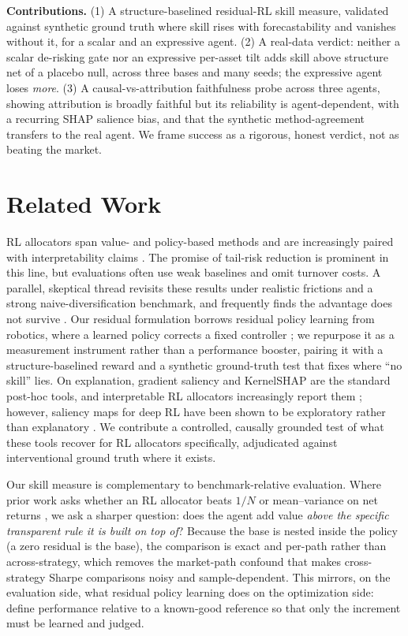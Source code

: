 \documentclass[sigconf,anonymous,review]{acmart}
\begin{document}
\noindent\textbf{Contributions.}
(1) A structure-baselined residual-RL skill measure, validated against synthetic
ground truth where skill rises with forecastability and vanishes without it, for a
scalar and an expressive agent.
(2) A real-data verdict: neither a scalar de-risking gate nor an expressive
per-asset tilt adds skill above structure net of a placebo null, across three bases
and many seeds; the expressive agent loses \emph{more}.
(3) A causal-vs-attribution faithfulness probe across three agents, showing
attribution is broadly faithful but its reliability is agent-dependent, with a
recurring SHAP salience bias, and that the synthetic method-agreement transfers to
the real agent. We frame success as a rigorous, honest verdict, not as beating the
market.

\section{Related Work}
RL allocators span value- and policy-based methods and are increasingly paired with
interpretability claims \cite{lavko2023,cong2021alphaportfolio,delarica2025}. The
promise of tail-risk reduction is prominent in this line, but evaluations often use
weak baselines and omit turnover costs. A parallel, skeptical thread revisits these
results under realistic frictions and a strong naive-diversification benchmark, and
frequently finds the advantage does not survive \cite{kruthof2025,demiguel2009}. Our
residual formulation borrows residual policy learning from robotics, where a learned
policy corrects a fixed controller \cite{silver2018,johannink2019}; we repurpose it
as a measurement instrument rather than a performance booster, pairing it with a
structure-baselined reward and a synthetic ground-truth test that fixes where
``no skill'' lies. On explanation, gradient saliency \cite{simonyan2014} and
KernelSHAP \cite{lundberg2017} are the standard post-hoc tools, and interpretable
RL allocators increasingly report them \cite{cong2021alphaportfolio,delarica2025};
however, saliency maps for deep RL have been shown to be exploratory rather than
explanatory \cite{atrey2020}. We contribute a controlled, causally grounded test of
what these tools recover for RL allocators specifically, adjudicated against
interventional ground truth where it exists.

Our skill measure is complementary to benchmark-relative evaluation. Where prior work
asks whether an RL allocator beats $1/N$ or mean--variance on net returns
\cite{demiguel2009,kruthof2025}, we ask a sharper question: does the agent add value
\emph{above the specific transparent rule it is built on top of}? Because the base is
nested inside the policy (a zero residual is the base), the comparison is exact and
per-path rather than across-strategy, which removes the market-path confound that
makes cross-strategy Sharpe comparisons noisy and sample-dependent. This mirrors, on
the evaluation side, what residual policy learning \cite{silver2018} does on the
optimization side: define performance relative to a known-good reference so that only
the increment must be learned and judged.
\end{document}
